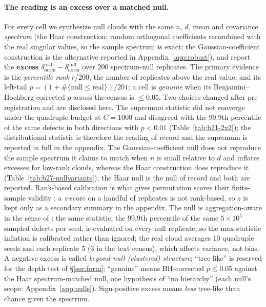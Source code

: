 \paragraph{The reading is an excess over a matched null.} For every cell we synthesize null clouds with the same $n$, $d$, mean and covariance \emph{spectrum} (the Haar construction: random orthogonal coefficients recombined with the real singular values, so the sample spectrum is exact; the Gaussian-coefficient construction is the alternative reported in Appendix~\ref{app:robust}), and report the \textbf{excess} $\delta_{\text{norm}}^{\text{real}}-\delta_{\text{norm}}^{\text{null}}$ over 200 spectrum-null replicates. The primary evidence is the \emph{percentile rank} $r$/200, the number of replicates above the real value, and its left-tail $p=(1+\#\{\text{null}\le\text{real}\})/201$; a cell is \emph{genuine} when its Benjamini--Hochberg-corrected $p$ across the census is $\le0.05$. Two choices changed after pre-registration and are disclosed here. The supremum statistic did not converge under the quadruple budget at $C{=}1000$ and disagreed with the 99.9th percentile of the same defects in both directions with $p<0.01$ (Table~\ref{tab:b21-2x2}); the distributional statistic is therefore the reading of record and the supremum is reported in full in the appendix. The Gaussian-coefficient null does not reproduce the sample spectrum it claims to match when $n$ is small relative to $d$ and inflates excesses for low-rank clouds, whereas the Haar construction does reproduce it (Table~\ref{tab:b27-nullvariants}); the Haar null is the null of record and both are reported. Rank-based calibration is what gives permutation scores their finite-sample validity \citep[\S5.1]{groger2026aristotelian}; a $z$-score on a handful of replicates is not rank-based, so $z$ is kept only as a secondary summary in the appendix. The null is aggregation-aware in the sense of \citet[\S5.2]{groger2026aristotelian}: the same statistic, the 99.9th percentile of the same $5{\times}10^5$ sampled defects per seed, is evaluated on every null replicate, so the max-statistic inflation is calibrated rather than ignored; the real cloud averages 10 quadruple seeds and each replicate 5 (3 in the text census), which affects variance, not bias. A negative excess is called \emph{beyond-null (clustered) structure}; ``tree-like'' is reserved for the depth test of \S\ref{sec:form}; ``genuine'' means BH-corrected $p\le0.05$ against the Haar spectrum-matched null, one hypothesis of ``no hierarchy'' (each null's scope: Appendix~\ref{app:nulls}). Sign-positive excess means \emph{less} tree-like than chance given the spectrum.

